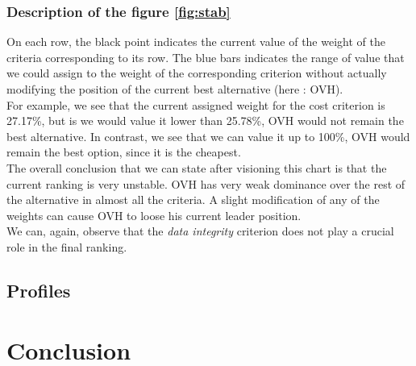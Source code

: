 \documentclass[a4paper,11pt]{article}
\begin{document}
\subsubsection*{Description of the figure \ref{fig:stab}}

On each row, the black point indicates the current value of the weight of the criteria corresponding to its row. The blue bars indicates the range of value that we could assign to the weight of the corresponding criterion without actually modifying the position of the current best alternative (here : OVH).\\

For example, we see that the current assigned weight for the cost criterion is 27.17\%, but is we would value it lower than 25.78\%, OVH would not remain the best alternative. In contrast, we see that we can value it up to 100\%, OVH would remain the best option, since it is the cheapest.\\

The overall conclusion that we can state after visioning this chart is that the current ranking is very unstable. OVH has very weak dominance over the rest of the alternative in almost all the criteria. A slight modification of any of the weights can cause OVH to loose his current leader position.\\

We can, again, observe that the \textit{data integrity} criterion does not play a crucial role in the final ranking.

\subsection{Profiles}

\section{Conclusion}
\end{document}

